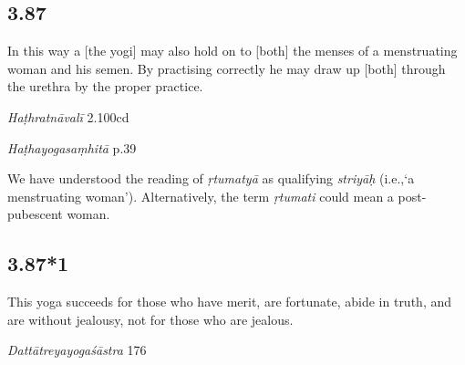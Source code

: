 \begin{ekdosis}
\subsection*{3.87}
\begin{translation}[hp03_087]
In this way a [the yogi] may also hold on to [both] the menses of a menstruating woman and his semen. By practising correctly he may draw up [both] through the urethra by the proper practice.
\end{translation}


\begin{testimonia}[hp03_087]
\emph{Haṭhratnāvalī} 2.100cd
\begin{versinnote}
\end{versinnote}

\emph{Haṭhayogasaṃhitā} p.39
\begin{versinnote}
\end{versinnote}
\end{testimonia}

\begin{philcomm}[hp03_087]
We have understood the reading of \emph{ṛtumatyā} as qualifying \emph{striyāḥ} (i.e.,`a menstruating woman'). Alternatively, the term \emph{ṛtumati} could mean a post-pubescent woman.
\end{philcomm}



\subsection*{3.87*1}
\begin{translation}[hp03_087_1]
This yoga succeeds for those who have merit, are fortunate, abide in truth, and are without jealousy, not for those who are jealous.
\end{translation}

\begin{sources}[hp03_087_1]
\emph{Dattātreyayogaśāstra} 176
\begin{versinnote}
\end{versinnote}
\end{sources}


\end{ekdosis}
